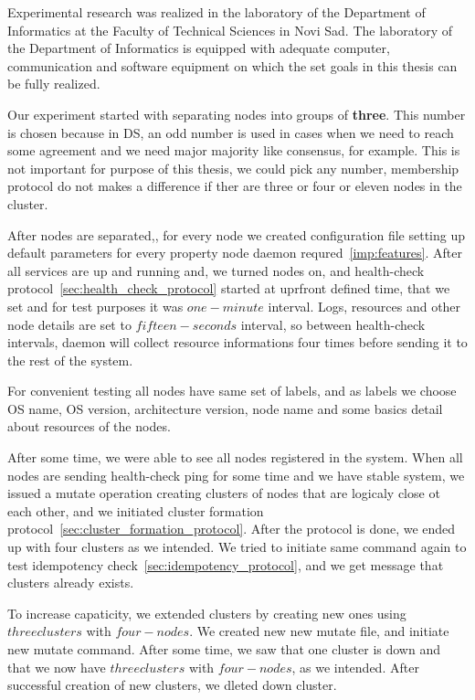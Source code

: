 Experimental research was realized in the laboratory of the Department of Informatics at the Faculty of Technical Sciences in Novi Sad. The laboratory of the Department of Informatics is equipped with adequate computer, communication and software equipment on which the set goals in this thesis can be fully realized.

Our experiment started with separating nodes into groups of \textbf{three}. This number is chosen because in DS, an odd number is used in cases when we need to reach some agreement and we need major majority like consensus, for example. This is not important for purpose of this thesis, we could pick any number, membership protocol do not makes a difference if ther are three or four or eleven nodes in the cluster.

After nodes are separated,, for every node we created configuration file setting up default parameters for every property node daemon requred~\ref{imp:features}. After all services are up and running and, we turned nodes on, and health-check protocol~\ref{sec:health_check_protocol} started at uprfront defined time, that we set and for test purposes it was $one-minute$ interval. Logs, resources and other node details are set to $fifteen-seconds$ interval, so between health-check intervals, daemon will collect resource informations  four times before sending it to the rest of the system.

For convenient testing all nodes have same set of labels, and as labels we choose OS name, OS version, architecture version, node name and some basics detail about resources of the nodes.

After some time, we were able to see all nodes registered in the system. When all nodes are sending health-check ping for some time and we have stable system, we issued a mutate operation creating clusters of nodes that are logicaly close ot each other, and we initiated cluster formation protocol~\ref{sec:cluster_formation_protocol}. After the protocol is done, we ended up with four clusters as we intended. We tried to initiate same command again to test idempotency check~\ref{sec:idempotency_protocol}, and we get message that clusters already exists.

To increase capaticity, we extended clusters by creating new ones using $three clusters$ with $four-nodes$. We created new new mutate file, and initiate new mutate command. After some time, we saw that one cluster is down and that we now have $three clusters$ with $four-nodes$, as we intended. After successful creation of new clusters, we dleted down cluster.

